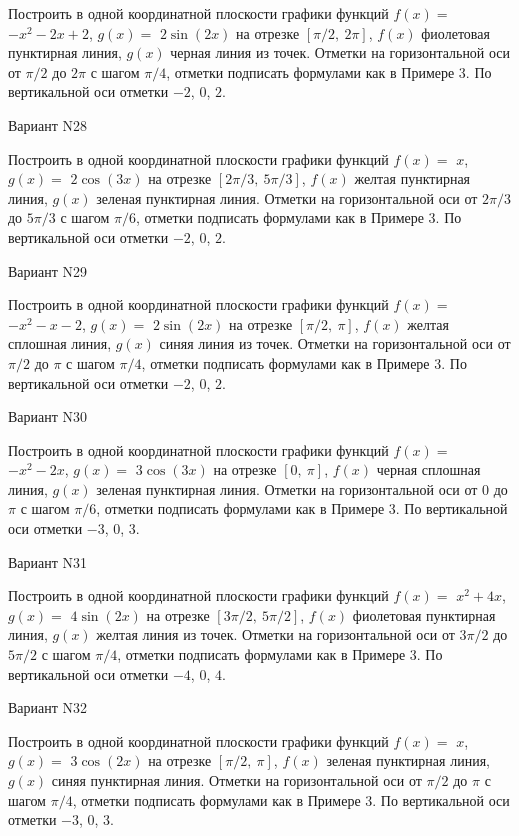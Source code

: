\documentclass[11pt]{report}
\begin{document}
Построить в одной координатной плоскости графики функций $f(x) = $
    $- x^{2} - 2 x + 2$, $g(x) = $
    $2 \sin{\left(2 x \right)}$ на 
    отрезке $\left[ \pi / 2, \  2 \pi\right]$, $f(x)$ фиолетовая 
    пунктирная линия, $g(x)$ черная линия из точек. 
    Отметки на горизонтальной оси от $\pi / 2$ до $2 \pi$ с 
    шагом $\pi / 4$, отметки подписать формулами как в Примере 3.  
    По вертикальной оси отметки $-2$, 0, $2$.

Вариант N28

Построить в одной координатной плоскости графики функций $f(x) = $
    $x$, $g(x) = $
    $2 \cos{\left(3 x \right)}$ на 
    отрезке $\left[ 2 \pi / 3, \  5 \pi / 3\right]$, $f(x)$ желтая 
    пунктирная линия, $g(x)$ зеленая пунктирная линия. 
    Отметки на горизонтальной оси от $2 \pi / 3$ до $5 \pi / 3$ с 
    шагом $\pi / 6$, отметки подписать формулами как в Примере 3.  
    По вертикальной оси отметки $-2$, 0, $2$.

Вариант N29

Построить в одной координатной плоскости графики функций $f(x) = $
    $- x^{2} - x - 2$, $g(x) = $
    $2 \sin{\left(2 x \right)}$ на 
    отрезке $\left[ \pi / 2, \  \pi\right]$, $f(x)$ желтая 
    сплошная линия, $g(x)$ синяя линия из точек. 
    Отметки на горизонтальной оси от $\pi / 2$ до $\pi$ с 
    шагом $\pi / 4$, отметки подписать формулами как в Примере 3.  
    По вертикальной оси отметки $-2$, 0, $2$.

Вариант N30

Построить в одной координатной плоскости графики функций $f(x) = $
    $- x^{2} - 2 x$, $g(x) = $
    $3 \cos{\left(3 x \right)}$ на 
    отрезке $\left[ 0, \  \pi\right]$, $f(x)$ черная 
    сплошная линия, $g(x)$ зеленая пунктирная линия. 
    Отметки на горизонтальной оси от $0$ до $\pi$ с 
    шагом $\pi / 6$, отметки подписать формулами как в Примере 3.  
    По вертикальной оси отметки $-3$, 0, $3$.

Вариант N31

Построить в одной координатной плоскости графики функций $f(x) = $
    $x^{2} + 4 x$, $g(x) = $
    $4 \sin{\left(2 x \right)}$ на 
    отрезке $\left[ 3 \pi / 2, \  5 \pi / 2\right]$, $f(x)$ фиолетовая 
    пунктирная линия, $g(x)$ желтая линия из точек. 
    Отметки на горизонтальной оси от $3 \pi / 2$ до $5 \pi / 2$ с 
    шагом $\pi / 4$, отметки подписать формулами как в Примере 3.  
    По вертикальной оси отметки $-4$, 0, $4$.

Вариант N32

Построить в одной координатной плоскости графики функций $f(x) = $
    $x$, $g(x) = $
    $3 \cos{\left(2 x \right)}$ на 
    отрезке $\left[ \pi / 2, \  \pi\right]$, $f(x)$ зеленая 
    пунктирная линия, $g(x)$ синяя пунктирная линия. 
    Отметки на горизонтальной оси от $\pi / 2$ до $\pi$ с 
    шагом $\pi / 4$, отметки подписать формулами как в Примере 3.  
    По вертикальной оси отметки $-3$, 0, $3$.
\end{document}
